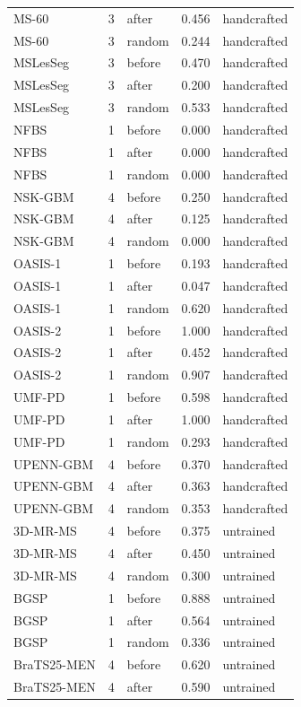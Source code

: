\begin{tabular}{lrlrl}
MS-60 & 3 & after & 0.456 & handcrafted \\
MS-60 & 3 & random & 0.244 & handcrafted \\
MSLesSeg & 3 & before & 0.470 & handcrafted \\
MSLesSeg & 3 & after & 0.200 & handcrafted \\
MSLesSeg & 3 & random & 0.533 & handcrafted \\
NFBS & 1 & before & 0.000 & handcrafted \\
NFBS & 1 & after & 0.000 & handcrafted \\
NFBS & 1 & random & 0.000 & handcrafted \\
NSK-GBM & 4 & before & 0.250 & handcrafted \\
NSK-GBM & 4 & after & 0.125 & handcrafted \\
NSK-GBM & 4 & random & 0.000 & handcrafted \\
OASIS-1 & 1 & before & 0.193 & handcrafted \\
OASIS-1 & 1 & after & 0.047 & handcrafted \\
OASIS-1 & 1 & random & 0.620 & handcrafted \\
OASIS-2 & 1 & before & 1.000 & handcrafted \\
OASIS-2 & 1 & after & 0.452 & handcrafted \\
OASIS-2 & 1 & random & 0.907 & handcrafted \\
UMF-PD & 1 & before & 0.598 & handcrafted \\
UMF-PD & 1 & after & 1.000 & handcrafted \\
UMF-PD & 1 & random & 0.293 & handcrafted \\
UPENN-GBM & 4 & before & 0.370 & handcrafted \\
UPENN-GBM & 4 & after & 0.363 & handcrafted \\
UPENN-GBM & 4 & random & 0.353 & handcrafted \\
3D-MR-MS & 4 & before & 0.375 & untrained \\
3D-MR-MS & 4 & after & 0.450 & untrained \\
3D-MR-MS & 4 & random & 0.300 & untrained \\
BGSP & 1 & before & 0.888 & untrained \\
BGSP & 1 & after & 0.564 & untrained \\
BGSP & 1 & random & 0.336 & untrained \\
BraTS25-MEN & 4 & before & 0.620 & untrained \\
BraTS25-MEN & 4 & after & 0.590 & untrained \\

\end{tabular}
